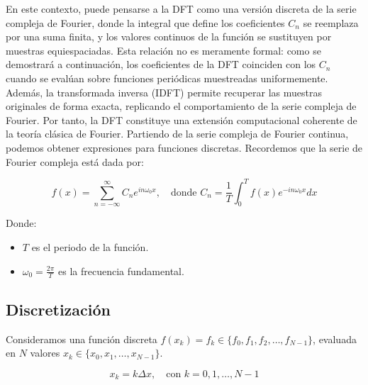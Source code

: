 En este contexto, puede pensarse a la DFT como una versión discreta de la serie compleja de Fourier, donde la integral que define los coeficientes \( C_n \) se reemplaza por una suma finita, y los valores continuos de la función se sustituyen por muestras equiespaciadas. Esta relación no es meramente formal: como se demostrará a continuación, los coeficientes de la DFT coinciden con los \( C_n \) cuando se evalúan sobre funciones periódicas muestreadas uniformemente. Además, la transformada inversa (IDFT) permite recuperar las muestras originales de forma exacta, replicando el comportamiento de la serie compleja de Fourier. Por tanto, la DFT constituye una extensión computacional coherente de la teoría clásica de Fourier.
\newline
Partiendo de la serie compleja de Fourier continua, podemos obtener expresiones para funciones discretas. Recordemos que la serie de Fourier compleja está dada por:

\[
f(x) = \sum_{n=-\infty}^{\infty} C_n e^{i n \omega_0 x}, \quad \text{donde } C_n = \frac{1}{T} \int_0^T f(x) e^{-i n \omega_0 x} dx
\]

Donde:
\begin{itemize}
	\item \( T \) es el periodo de la función.
	\item \( \omega_0 = \frac{2\pi}{T} \) es la frecuencia fundamental.
\end{itemize}

\subsection{Discretización}

Consideramos una función discreta \( f(x_k) = f_k \in \{f_0, f_1, f_2, \ldots, f_{N-1}\} \), evaluada en \( N \) valores \( x_k \in \{x_0, x_1, \ldots, x_{N-1}\} \). 

\[
x_k = k \Delta x, \quad \text{con } k = 0, 1, \ldots, N-1
\]


